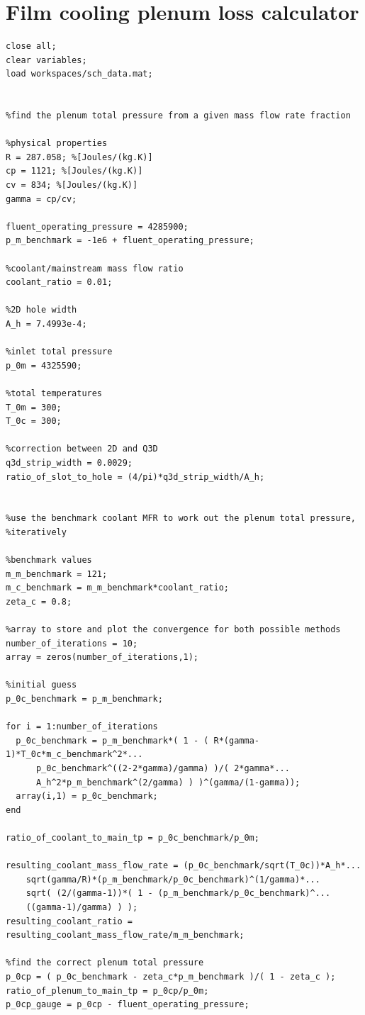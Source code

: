 \documentclass[a4paper, 11pt, oneside]{report}
\begin{document}
\section{Film cooling plenum loss calculator}
\begin{verbatim}
close all;
clear variables;
load workspaces/sch_data.mat;


%find the plenum total pressure from a given mass flow rate fraction

%physical properties
R = 287.058; %[Joules/(kg.K)]
cp = 1121; %[Joules/(kg.K)]
cv = 834; %[Joules/(kg.K)]
gamma = cp/cv;

fluent_operating_pressure = 4285900;
p_m_benchmark = -1e6 + fluent_operating_pressure;

%coolant/mainstream mass flow ratio
coolant_ratio = 0.01;

%2D hole width
A_h = 7.4993e-4;

%inlet total pressure
p_0m = 4325590;

%total temperatures
T_0m = 300;
T_0c = 300;

%correction between 2D and Q3D
q3d_strip_width = 0.0029;
ratio_of_slot_to_hole = (4/pi)*q3d_strip_width/A_h;


%use the benchmark coolant MFR to work out the plenum total pressure,
%iteratively

%benchmark values
m_m_benchmark = 121;
m_c_benchmark = m_m_benchmark*coolant_ratio;
zeta_c = 0.8;

%array to store and plot the convergence for both possible methods
number_of_iterations = 10;
array = zeros(number_of_iterations,1);

%initial guess
p_0c_benchmark = p_m_benchmark;

for i = 1:number_of_iterations
  p_0c_benchmark = p_m_benchmark*( 1 - ( R*(gamma-1)*T_0c*m_c_benchmark^2*...
      p_0c_benchmark^((2-2*gamma)/gamma) )/( 2*gamma*...
      A_h^2*p_m_benchmark^(2/gamma) ) )^(gamma/(1-gamma));
  array(i,1) = p_0c_benchmark;
end

ratio_of_coolant_to_main_tp = p_0c_benchmark/p_0m;

resulting_coolant_mass_flow_rate = (p_0c_benchmark/sqrt(T_0c))*A_h*...
    sqrt(gamma/R)*(p_m_benchmark/p_0c_benchmark)^(1/gamma)*...
    sqrt( (2/(gamma-1))*( 1 - (p_m_benchmark/p_0c_benchmark)^...
    ((gamma-1)/gamma) ) );
resulting_coolant_ratio = resulting_coolant_mass_flow_rate/m_m_benchmark;

%find the correct plenum total pressure
p_0cp = ( p_0c_benchmark - zeta_c*p_m_benchmark )/( 1 - zeta_c );
ratio_of_plenum_to_main_tp = p_0cp/p_0m;
p_0cp_gauge = p_0cp - fluent_operating_pressure;



\end{verbatim}
\end{document}
